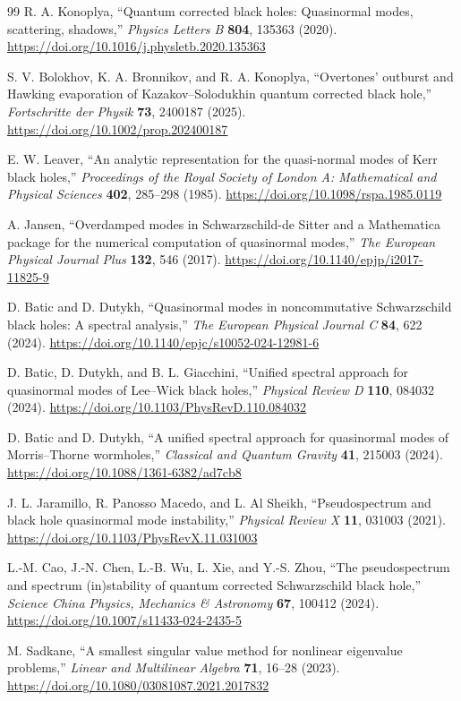 \documentclass[10pt,letterpaper,twocolumn]{article}
\begin{document}
\begin{thebibliography}{99}
R. A. Konoplya,
``Quantum corrected black holes: Quasinormal modes, scattering, shadows,''
\emph{Physics Letters B} \textbf{804}, 135363 (2020).
\url{https://doi.org/10.1016/j.physletb.2020.135363}

S. V. Bolokhov, K. A. Bronnikov, and R. A. Konoplya,
``Overtones' outburst and Hawking evaporation of Kazakov--Solodukhin quantum corrected black hole,''
\emph{Fortschritte der Physik} \textbf{73}, 2400187 (2025).
\url{https://doi.org/10.1002/prop.202400187}

E. W. Leaver,
``An analytic representation for the quasi-normal modes of Kerr black holes,''
\emph{Proceedings of the Royal Society of London A: Mathematical and Physical Sciences} \textbf{402}, 285--298 (1985).
\url{https://doi.org/10.1098/rspa.1985.0119}

A. Jansen,
``Overdamped modes in Schwarzschild-de Sitter and a Mathematica package for the numerical computation of quasinormal modes,''
\emph{The European Physical Journal Plus} \textbf{132}, 546 (2017).
\url{https://doi.org/10.1140/epjp/i2017-11825-9}

D. Batic and D. Dutykh,
``Quasinormal modes in noncommutative Schwarzschild black holes: A spectral analysis,''
\emph{The European Physical Journal C} \textbf{84}, 622 (2024).
\url{https://doi.org/10.1140/epjc/s10052-024-12981-6}

D. Batic, D. Dutykh, and B. L. Giacchini,
``Unified spectral approach for quasinormal modes of Lee--Wick black holes,''
\emph{Physical Review D} \textbf{110}, 084032 (2024).
\url{https://doi.org/10.1103/PhysRevD.110.084032}

D. Batic and D. Dutykh,
``A unified spectral approach for quasinormal modes of Morris--Thorne wormholes,''
\emph{Classical and Quantum Gravity} \textbf{41}, 215003 (2024).
\url{https://doi.org/10.1088/1361-6382/ad7cb8}

J. L. Jaramillo, R. Panosso Macedo, and L. Al Sheikh,
``Pseudospectrum and black hole quasinormal mode instability,''
\emph{Physical Review X} \textbf{11}, 031003 (2021).
\url{https://doi.org/10.1103/PhysRevX.11.031003}

L.-M. Cao, J.-N. Chen, L.-B. Wu, L. Xie, and Y.-S. Zhou,
``The pseudospectrum and spectrum (in)stability of quantum corrected Schwarzschild black hole,''
\emph{Science China Physics, Mechanics \& Astronomy} \textbf{67}, 100412 (2024).
\url{https://doi.org/10.1007/s11433-024-2435-5}

M. Sadkane,
``A smallest singular value method for nonlinear eigenvalue problems,''
\emph{Linear and Multilinear Algebra} \textbf{71}, 16--28 (2023).
\url{https://doi.org/10.1080/03081087.2021.2017832}

\end{thebibliography}
\end{document}
